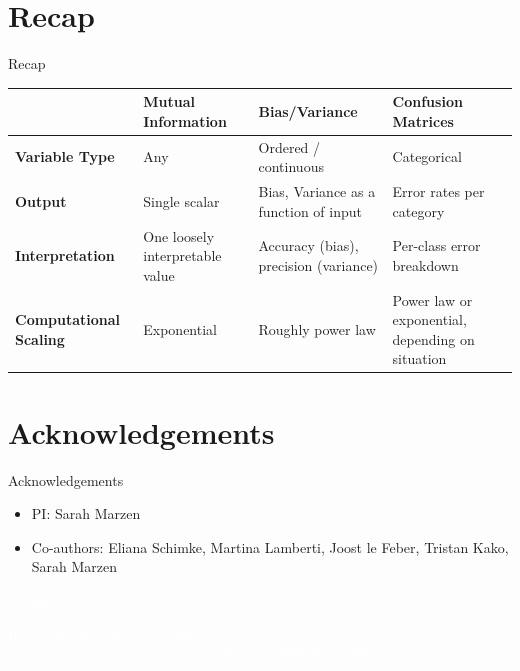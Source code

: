 \documentclass[10pt, aspectratio=169]{beamer}
\begin{document}
\section{Recap}

\begin{frame}{Recap}
	\renewcommand{\arraystretch}{2}
	\centering
	\footnotesize
	\begin{tabular}{@{} l p{3.1cm} p{3.1cm} p{3.1cm} @{}}
		\toprule
		 & \textcolor{MathGreen}{\textbf{Mutual Information}} & \textcolor{MathGreen}{\textbf{Bias/Variance}} & \textcolor{MathGreen}{\textbf{Confusion Matrices}} \\
		\midrule
		\textbf{Variable Type} & Any & Ordered / continuous & Categorical \\
		\textbf{Output} & Single scalar & Bias, Variance as a function of input & Error rates per category \\
		\textbf{Interpretation} & One loosely interpretable value & Accuracy (bias), precision (variance) & Per-class error breakdown \\
		\textbf{Computational Scaling} & Exponential & Roughly power law & Power law or exponential, depending on situation \\
		\bottomrule
	\end{tabular}
\end{frame}

\section{Acknowledgements}

\begin{frame}{Acknowledgements}
	\begin{itemize}\addtolength{\itemsep}{10pt}
		\item PI: Sarah Marzen
		\item Co-authors: Eliana Schimke, Martina Lamberti, Joost le Feber, Tristan Kako, Sarah Marzen
	\end{itemize}
\end{frame}

{\BackgroundShaded
\begin{frame}
\begin{center}
	\Large{\textcolor{white}{Thank you!}}
\end{center}
\vspace{1cm}
\textcolor{white}{Here's the paper for more info: https://www.biorxiv.org/content/10.64898/2026.01.12.698979v1}
\end{frame}}
\end{document}
